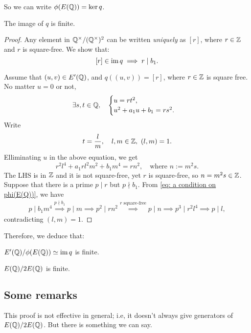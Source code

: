 So we can write $\phi(E(\mathbb{Q})) = \ker q$.
\begin{lemma}\label{E'(Q) to Q/Q2 has finite image}
    The image of $q$ is finite.
\end{lemma}
\begin{proof}
    Any element in $\mathbb{Q}^\times/(\mathbb{Q}^\times)^2$ can be written \textit{uniquely} as $[r]$,
    where $r\in\mathbb{Z}$ and $r$ is square-free.
    We show that: \[[r]\in\operatorname{im} q\implies r\mid b_1.\]
    
    Assume that $(u, v)\in E'(\mathbb{Q})$, and $q((u, v)) = [r]$,
    where $r\in\mathbb{Z}$ is square free.
    No matter $u = 0$ or not,\[\exists s, t\in\mathbb{Q},\quad \begin{cases}
        u = rt^2,\\u^2 + a_1u + b_1 = rs^2.
    \end{cases}\]
    Write \[t = \dfrac{l}{m}, \quad l, m\in\mathbb{Z},\  (l, m) = 1.\]
    Elliminating $u$ in the above equation, we get\begin{equation}\label{eq: a condition on phi(E(Q))}
        r^2l^4 + a_1rl^2m^2 + b_1m^4 = rn^2,\quad\text{where }n := m^2s.
    \end{equation}
    The LHS is in $\mathbb{Z}$ and it is not square-free,
    yet $r$ is square-free, so $n = m^2s\in\mathbb{Z}$.
    Suppose that there is a prime $p\mid r$ but $p\nmid b_1$.
    From \cref{eq: a condition on phi(E(Q))},
    we have \begin{align}
        p\mid b_1m^4\stackrel{p\nmid b_1}{\implies}
        p\mid m\implies
        p^2\mid rn^2\stackrel{r\text{ square-free}}{\implies}
        p\mid n\implies
        p^3\mid r^2l^4\implies
        p\mid l,
    \end{align}
    contradicting $(l , m) = 1$.
\end{proof}



Therefore, we deduce that:\begin{theorem}
    $E'(\mathbb{Q})/\phi(E(\mathbb{Q}))\simeq \operatorname{im} q$ is finite.
\end{theorem}

\begin{corollary}
    $E(\mathbb{Q})/2E(\mathbb{Q})$ is finite.
\end{corollary}

\subsection*{Some remarks}
This proof is not effective in general; i.e,
it doesn't always give generators of $E(\mathbb{Q})/2E(\mathbb{Q})$.
But there is something we can say.

